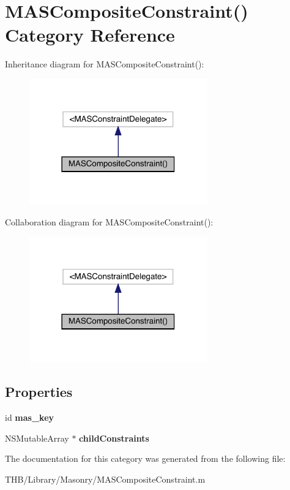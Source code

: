 \hypertarget{category_m_a_s_composite_constraint_07_08}{}\section{M\+A\+S\+Composite\+Constraint() Category Reference}
\label{category_m_a_s_composite_constraint_07_08}


Inheritance diagram for M\+A\+S\+Composite\+Constraint()\+:\nopagebreak
\begin{figure}[H]
\begin{center}
\leavevmode
\includegraphics[width=218pt]{category_m_a_s_composite_constraint_07_08__inherit__graph}
\end{center}
\end{figure}


Collaboration diagram for M\+A\+S\+Composite\+Constraint()\+:\nopagebreak
\begin{figure}[H]
\begin{center}
\leavevmode
\includegraphics[width=218pt]{category_m_a_s_composite_constraint_07_08__coll__graph}
\end{center}
\end{figure}
\subsection*{Properties}
\begin{DoxyCompactItemize}
\item 
\mbox{\label{category_m_a_s_composite_constraint_07_08_ac98a93f4a35d7237bc2325109d28f8e1}} 
id {\bfseries mas\+\_\+key}
\item 
\mbox{\label{category_m_a_s_composite_constraint_07_08_afe7f0b086d8f5655780659e3c57aa74b}} 
N\+S\+Mutable\+Array $\ast$ {\bfseries child\+Constraints}
\end{DoxyCompactItemize}


The documentation for this category was generated from the following file\+:\begin{DoxyCompactItemize}
\item 
T\+H\+B/\+Library/\+Masonry/M\+A\+S\+Composite\+Constraint.\+m\end{DoxyCompactItemize}
